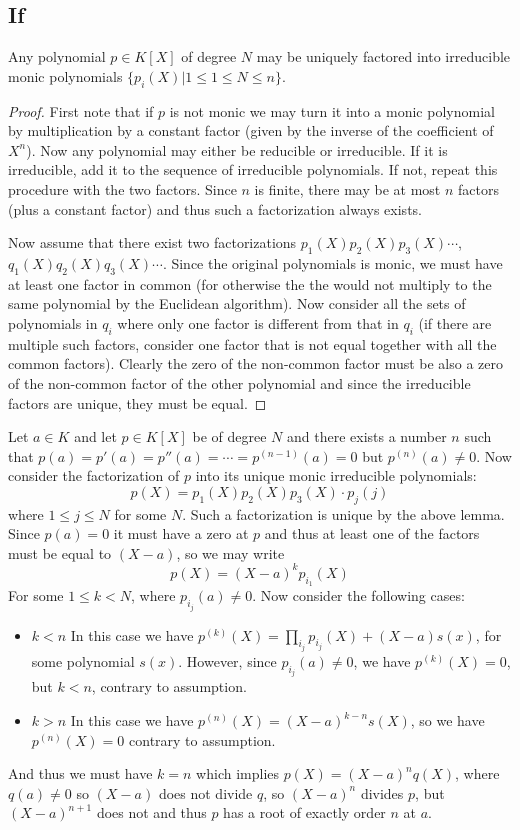 \subsection*{If}
\begin{lemma}
Any polynomial $p\in K[X]$ of degree $N$ may be uniquely factored into irreducible monic polynomials $\{ p_i(X) | 1\leq 1\leq N \leq n \}$.
\begin{proof}
First note that if $p$ is not monic we may turn it into a monic polynomial by multiplication by a constant factor (given by the inverse of the coefficient of $X^n$). Now any polynomial may either be reducible or irreducible. If it is irreducible, add it to the sequence of irreducible polynomials. If not, repeat this procedure with the two factors. Since $n$ is finite, there may be at most $n$  factors (plus a constant factor) and thus such a factorization always exists. \par
Now assume that there exist two factorizations $p_1(X)p_2(X)p_3(X)\cdots$, $q_1(X)q_2(X)q_3(X)\cdots$. Since the original polynomials is monic, we must have at least one factor in common (for otherwise the the would not multiply to the same polynomial by the Euclidean algorithm). Now consider all the sets of polynomials in $q_i$ where only one factor is different from that in $q_i$ (if there are multiple such factors, consider one factor that is not equal together with all the common factors). Clearly the zero of the non-common factor must be also a zero of the non-common factor of the other polynomial and since the irreducible factors are unique, they must be equal. 
\end{proof}
\end{lemma}
Let $a\in K$ and let $p\in K[X]$ be of degree $N$ and there exists a number $n$ such that $p(a)=p'(a) = p''(a) = \cdots = p^{(n-1)}(a) = 0$ but $p^{(n)}(a)\neq 0$. Now consider the factorization of $p$ into its unique monic irreducible polynomials:
\[ p(X)=p_1(X)p_2(X)p_3(X)\cdot p_j(j) \]
where $1\leq j \leq N$ for some $N$. Such a factorization is unique by the above lemma. Since $p(a)=0$ it must have a zero at $p$ and thus at least one of the factors must be equal to $(X-a)$, so we may write
\[ p(X)=(X-a)^k p_{i_1}(X) \]
For some $1\leq k<N$, where $p_{i_j}(a)\neq 0$. Now consider the following cases:
\begin{itemize}
\item $k<n$ In this case we have $p^{(k)}(X) = \prod_{i_j} p_{i_j}(X) + (X-a)s(x)$, for some polynomial $s(x)$. However, since $p_{i_j}(a)\neq 0$, we have $p^{(k)}(X)=0$, but $k<n$, contrary to assumption.
\item $k>n$ In this case we have $p^{(n)}(X) = (X-a)^{k-n}s(X)$, so we have $p^{(n)}(X) = 0$ contrary to assumption.
\end{itemize}
And thus we must have $k=n$ which implies $p(X)=(X-a)^nq(X)$, where $q(a)\neq 0$ so $(X-a)$ does not divide $q$, so $(X-a)^n$ divides $p$, but $(X-a)^{n+1}$ does not and thus $p$ has a root of exactly order $n$ at $a$.
